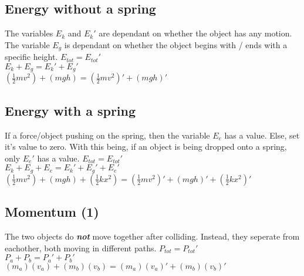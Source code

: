 \begin{adjustwidth}{1cm}{0pt}
    \subsection{Energy without a spring}
    \begin{flushleft}
        The variables $E_{k}$ and $E_{k}\prime$ are dependant on whether the object has any motion. The variable $E_{g}$ is dependant on whether the object begins with / ends with a specific height.\newline\newline
        $E_{tot} = E_{tot}\prime$ \\
        \vspace*{10pt}
        $E_{k} + E_{g} = E_{k}\prime + E_{g}\prime$ \\
        \vspace*{10pt}
        $(\frac{1}{2}mv^2) + (mgh) = (\frac{1}{2}mv^2)\prime + (mgh)\prime$
    \end{flushleft}
    \subsection{Energy with a spring}
    \begin{flushleft}
        If a force/object pushing on the spring, then the variable $E_{e}$ has a value. Else, set it's value to zero. With this being, if an object is being dropped onto a spring, only $E_{e}\prime$ has a value.\newline\newline
        $E_{tot} = E_{tot}\prime$ \\
        \vspace*{10pt}
        $E_{k} + E_{g} + E_{e} = E_{k}\prime + E_{g}\prime + E_{e}\prime$ \\
        \vspace*{10pt}
        $(\frac{1}{2}mv^2) + (mgh) + (\frac{1}{2}kx^2) = (\frac{1}{2}mv^2)\prime + (mgh)\prime + (\frac{1}{2}kx^2)\prime$
    \end{flushleft}
    \subsection{Momentum (1)}
    \begin{flushleft}
        The two objects do \textbf{\textit{not}} move together after colliding. Instead, they seperate from eachother, both moving in different paths.\newline\newline
        $P_{tot} = P_{tot}\prime$ \\
        \vspace*{10pt}
        $P_{a} + P_{b} = P_{a}\prime + P_{b}\prime$ \\
        \vspace*{10pt}
        $(m_{a})(v_{a}) + (m_{b})(v_{b}) = (m_{a})(v_{a})\prime + (m_{b})(v_{b})\prime$
    \end{flushleft}
    \vspace*{0.03cm}

\end{adjustwidth}
